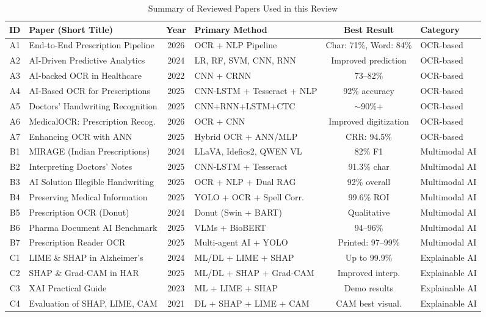 \documentclass[conference]{IEEEtran}
\begin{document}
\begin{table}[!htbp]
\centering
\caption{Summary of Reviewed Papers Used in this Review}
\label{tab:summary_method}
\footnotesize
\begin{tabular}{|c|l|c|l|c|l|}
\hline
\textbf{ID} & \textbf{Paper (Short Title)} & \textbf{Year} & \textbf{Primary Method} & \textbf{Best Result} & \textbf{Category} \\
\hline
A1 & End-to-End Prescription Pipeline & 2026 & OCR + NLP Pipeline & Char: 71\%, Word: 84\% & OCR-based \\
A2 & AI-Driven Predictive Analytics & 2024 & LR, RF, SVM, CNN, RNN & Improved prediction & OCR-based \\
A3 & AI-backed OCR in Healthcare & 2022 & CNN + CRNN & 73--82\% & OCR-based \\
A4 & AI-Based OCR for Prescriptions & 2025 & CNN-LSTM + Tesseract + NLP & 92\% accuracy & OCR-based \\
A5 & Doctors' Handwriting Recognition & 2025 & CNN+RNN+LSTM+CTC & $\sim$90\%+ & OCR-based \\
A6 & MedicalOCR: Prescription Recog. & 2026 & OCR + CNN & Improved digitization & OCR-based \\
A7 & Enhancing OCR with ANN & 2025 & Hybrid OCR + ANN/MLP & CRR: 94.5\% & OCR-based \\
\hline
B1 & MIRAGE (Indian Prescriptions) & 2024 & LLaVA, Idefics2, QWEN VL & 82\% F1 & Multimodal AI \\
B2 & Interpreting Doctors' Notes & 2025 & CNN-LSTM + Tesseract & 91.3\% char & Multimodal AI \\
B3 & AI Solution Illegible Handwriting & 2025 & OCR + NLP + Dual RAG & 92\% overall & Multimodal AI \\
B4 & Preserving Medical Information & 2025 & YOLO + OCR + Spell Corr. & 99.6\% ROI & Multimodal AI \\
B5 & Prescription OCR (Donut) & 2024 & Donut (Swin + BART) & Qualitative & Multimodal AI \\
B6 & Pharma Document AI Benchmark & 2025 & VLMs + BioBERT & 94--96\% & Multimodal AI \\
B7 & Prescription Reader OCR & 2025 & Multi-agent AI + YOLO & Printed: 97--99\% & Multimodal AI \\
\hline
C1 & LIME \& SHAP in Alzheimer's & 2024 & ML/DL + LIME + SHAP & Up to 99.9\% & Explainable AI \\
C2 & SHAP \& Grad-CAM in HAR & 2025 & ML/DL + SHAP + Grad-CAM & Improved interp. & Explainable AI \\
C3 & XAI Practical Guide & 2023 & ML + LIME + SHAP & Demo results & Explainable AI \\
C4 & Evaluation of SHAP, LIME, CAM & 2021 & DL + SHAP + LIME + CAM & CAM best visual. & Explainable AI \\
\hline
\end{tabular}
\end{table}
\end{document}
